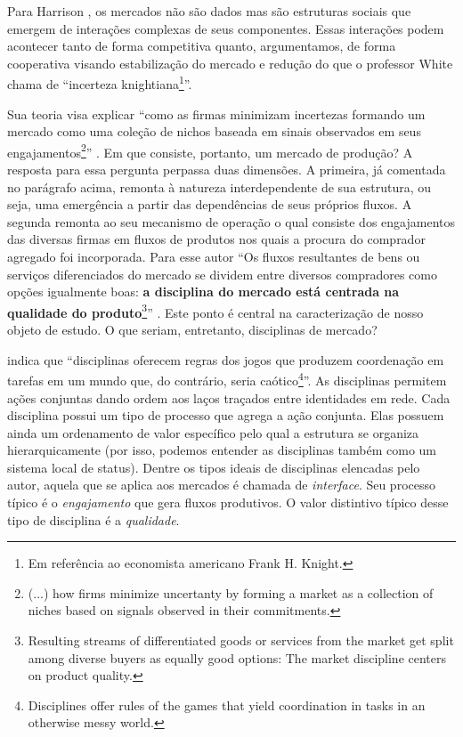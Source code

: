\documentclass[a4paper, 12pt, openright, oneside, german, french, english, brazil]{abntex2}
\begin{document}
	Para Harrison , os mercados não são dados mas são estruturas sociais que emergem de interações complexas de seus componentes. Essas interações podem acontecer tanto de forma competitiva quanto, argumentamos, de forma cooperativa visando estabilização do mercado e redução do que o professor White chama de ``incerteza knightiana\footnote{Em referência ao economista americano Frank H. Knight.}''.

	Sua teoria visa explicar ``como as firmas minimizam incertezas formando um mercado como uma coleção de nichos baseada em sinais observados em seus engajamentos\footnote{(...) how firms minimize uncertanty by forming a market as a collection of niches based on signals observed in their commitments.}'' \cite[p. xiii]{white2002markets}. Em que consiste, portanto, um mercado de produção? A resposta para essa pergunta perpassa duas dimensões. A primeira, já comentada no parágrafo acima, remonta à natureza interdependente de sua estrutura, ou seja, uma emergência a partir das dependências de seus próprios fluxos. A segunda remonta ao seu mecanismo de operação o qual consiste dos engajamentos das diversas firmas em fluxos de produtos nos quais a procura do comprador agregado foi incorporada. Para esse autor ``Os fluxos resultantes de bens ou serviços diferenciados do mercado se dividem entre diversos compradores como opções igualmente boas: \textbf{a disciplina do mercado está centrada na qualidade do produto}\footnote{Resulting streams of differentiated goods or services from the market get split among diverse buyers as equally good options: The market discipline centers on product quality.}'' \cite[p. 1, grifo meu]{white2002markets}. Este ponto é central na caracterização de nosso objeto de estudo. O que seriam, entretanto, disciplinas de mercado?

	 indica que ``disciplinas oferecem regras dos jogos que produzem coordenação em tarefas em um mundo que, do contrário, seria caótico\footnote{Disciplines offer rules of the games that yield coordination in tasks in an otherwise messy world.}''. As disciplinas permitem ações conjuntas dando ordem aos laços traçados entre identidades em rede. Cada disciplina possui um tipo de processo que agrega a ação conjunta. Elas possuem ainda um ordenamento de valor específico pelo qual a estrutura se organiza hierarquicamente (por isso, podemos entender as disciplinas também como um sistema local de status). Dentre os tipos ideais de disciplinas elencadas pelo autor, aquela que se aplica aos mercados é chamada de \textit{interface}. Seu processo típico é o \textit{engajamento} que gera fluxos produtivos. O valor distintivo típico desse tipo de disciplina é a \textit{qualidade}.
\end{document}
